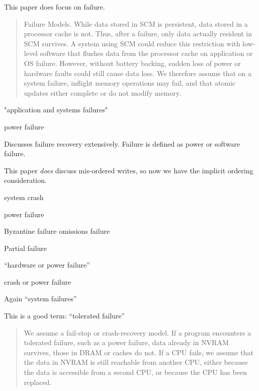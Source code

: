 \cite{volos2011mnemosyne}

This paper does focus on failure.

\begin{quotation}
Failure Models. While data stored in SCM is persistent, data
stored in a processor cache is not. Thus, after a failure, only data
actually resident in SCM survives. A system using SCM could reduce
this restriction with low-level software that flushes data from
the processor cache on application or OS failure. However, without
battery backing, sudden loss of power or hardware faults could still
cause data loss. We therefore assume that on a system failure, inflight
memory operations may fail, and that atomic updates either
complete or do not modify memory.
\end{quotation}


\cite{coburn2011nv}

"application and systems failures"

power failure

\cite{venkataraman2011consistent}

Discusses failure recovery extensively.  Failure is defined as power or software failure.

This paper \textit{does} discuss mis-ordered writes, so now we have the implicit ordering consideration.

system crash

power failure

\cite{mahajan2011consistency}

Byzantine failure
omissions failure

\cite{conway2012logic}

Partial failure

\cite{bhandari2012implications}

``hardware or power failure''

\cite{moraru2013consistent}

crash or power failure


\cite{zhao2013kiln}


Again ``system failures''

\cite{chakrabarti2014atlas}

This is a good term: ``tolerated failure''

\begin{quotation}
We assume a fail-stop or crash-recovery model. If a program
encounters a tolerated failure, such as a power failure, data
already in NVRAM survives, those in DRAM or caches do not. If
a CPU fails, we assume that the data in NVRAM is still reachable
from another CPU, either because the data is accessible from a
second CPU, or because the CPU has been replaced.
\end{quotation}

